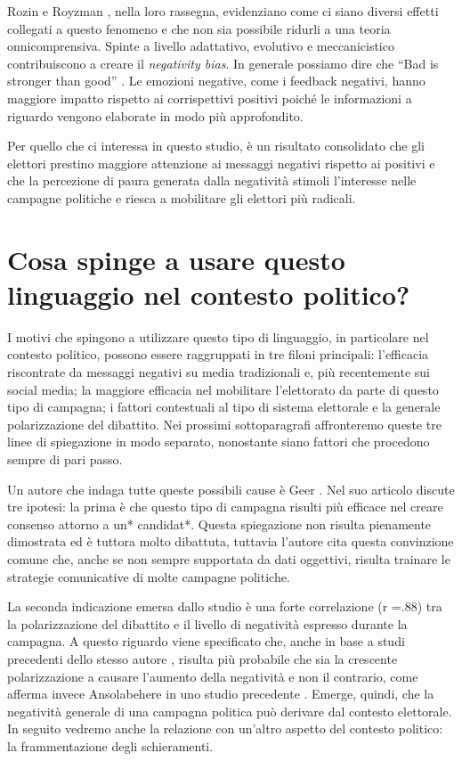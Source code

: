 Rozin e Royzman \citep{rozin2001}, nella loro rassegna, evidenziano come ci siano diversi effetti collegati a questo fenomeno e che non sia possibile ridurli a una teoria onnicomprensiva. Spinte a livello adattativo, evolutivo e meccanicistico contribuiscono a creare il \textit{negativity bias}.
In generale possiamo dire che “Bad is stronger than good” \citep{baumeister2001}. Le emozioni negative, come i feedback negativi, hanno maggiore impatto rispetto ai corrispettivi positivi poiché le informazioni a riguardo vengono elaborate in modo più approfondito.

Per quello che ci interessa in questo studio, è un risultato consolidato che gli elettori prestino maggiore attenzione ai messaggi negativi rispetto ai positivi e che la percezione di paura generata dalla negatività stimoli l’interesse nelle campagne politiche e riesca a mobilitare gli elettori più radicali.


\section{Cosa spinge a usare questo linguaggio nel contesto politico?}
I motivi che spingono a utilizzare questo tipo di linguaggio, in particolare nel contesto politico, possono essere raggruppati in tre filoni principali: l'efficacia riscontrate da messaggi negativi su media tradizionali e, più recentemente sui social media; la maggiore efficacia nel mobilitare l'elettorato da parte di questo tipo di campagna; i fattori contestuali al tipo di sistema elettorale e la generale polarizzazione del dibattito. Nei prossimi sottoparagrafi affronteremo queste tre linee di spiegazione in modo separato, nonostante siano fattori che procedono sempre di pari passo.

Un autore che indaga tutte queste possibili cause è Geer \citep{geer2012}. Nel suo articolo  discute tre ipotesi: la prima è che questo tipo di campagna risulti più efficace nel creare consenso attorno a un* candidat*. Questa spiegazione non risulta pienamente dimostrata ed è tuttora molto dibattuta, tuttavia l'autore cita questa convinzione comune che, anche se non sempre supportata da dati oggettivi, risulta trainare le strategie comunicative di molte campagne politiche.

La seconda indicazione emersa dallo studio è una forte correlazione (r =.88) tra la polarizzazione del dibattito e il livello di negatività espresso durante la campagna. A questo riguardo viene specificato che, anche in base a studi precedenti dello stesso autore \citep{geer2006}, risulta più probabile che sia la crescente polarizzazione a causare l'aumento della negatività e non il contrario, come afferma invece Ansolabehere in uno studio precedente \citep{anso1995}. Emerge, quindi, che la negatività generale di una campagna politica può derivare dal contesto elettorale. In seguito vedremo anche la relazione con un'altro aspetto del contesto politico: la frammentazione degli schieramenti.

